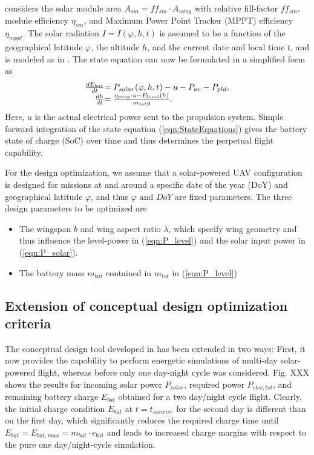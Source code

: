 considers the solar module area $A_{sm}=ff_{sm}\cdot A_{wing}$ with relative fill-factor $ff_{sm}$, module efficiency $\eta_{sm}$, and Maximum Power Point Tracker (MPPT) efficiency $\eta_{mppt}$. The solar radiation $I=I(\varphi,h,t)$ is assumed to be a function of the geographical latitude $\varphi$, the altitude $h$, and the current date and local time $t$, and is modeled as in \cite{Duffie_SolarEngineering}.
The state equation can now be formulated in a simplified form as
\begin{equation}\label{eqn:StateEquations}
\begin{array}{r@{}l}
\frac{dE_{bat}}{dt}&=P_{solar}(\varphi,h,t)-u-P_{av}-P_{pld},\\
\frac{dh}{dt}&=\frac{\eta_{prop}\cdot u-P_{level}(h)}{m_{tot}g} .
\end{array}
\end{equation}
Here, $u$ is the actual electrical power sent to the propulsion system. Simple forward integration of the state equation (\ref{eqn:StateEquations}) gives the battery state of charge (SoC) over time and thus determines the perpetual flight capability.

For the design optimization, we assume that a solar-powered UAV configuration is designed for missions at and around a specific date of the year (DoY) and geographical latitude $\varphi$, and thus $\varphi$ and $DoY$ are fixed parameters. The three design parameters to be optimized are
\begin{itemize}
\item The wingspan $b$ and wing aspect ratio $\lambda$, which specify wing geometry and thus influence the level-power in (\ref{eqn:P_level}) and the solar input power in (\ref{eqn:P_solar}).
\item The battery mass $m_{bat}$ contained in $m_{tot}$ in (\ref{eqn:P_level}) 
\end{itemize}
\subsection{Extension of conceptual design optimization criteria}

The conceptual design tool developed in \cite{Noth_PhD,Leutenegger_JIRS} has been extended in two ways: First, it now provides the capability to perform energetic simulations of multi-day solar-powered flight, whereas before only one day-night cycle was considered. Fig. XXX shows the results for incoming solar power $P_{solar}$, required power $P_{elec,tot}$, and remaining battery charge $E_{bat}$ obtained for a two day/night cycle flight. Clearly, the initial charge condition $E_{bat}$ at $t=t_{sunrise}$ for the second day is different than on the first day, which significantly reduces the required charge time until $E_{bat}=E_{bat,max}=m_{bat}\cdot e_{bat}$ and leads to increased charge margins with respect to the pure one day/night-cycle simulation. %


